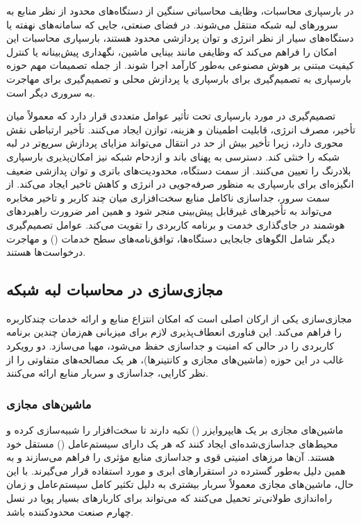 در بارسپاری محاسبات، وظایف محاسباتی سنگین از دستگاه‌های محدود از نظر منابع به سرورهای لبه شبکه منتقل می‌شوند. در فضای صنعتی، جایی که سامانه‌های نهفته یا دستگاه‌های سیار از نظر انرژی و توان پردازشی محدود هستند، بارسپاری محاسبات این امکان را فراهم می‌کند که وظایفی مانند بینایی ماشین، نگهداری پیش‌بینانه یا کنترل کیفیت مبتنی بر هوش مصنوعی به‌طور کارآمد اجرا شوند. از جمله تصمیمات مهم حوزه بارسپاری به تصمیم‌گیری برای بارسپاری یا پردازش محلی و تصمیم‌گیری برای مهاجرت به سرور‌ی دیگر است.

تصمیم‌گیری در مورد بارسپاری تحت تأثیر عوامل متعددی قرار دارد که معمولاً میان تأخیر، مصرف انرژی، قابلیت اطمینان و هزینه، توازن ایجاد می‌کنند. تأخیر ارتباطی نقش محوری دارد، زیرا تأخیر بیش از حد در انتقال می‌تواند مزایای پردازش سریع‌تر در لبه شبکه را خنثی کند. دسترسی به پهنای باند و ازدحام شبکه نیز امکان‌پذیری بارسپاری بلادرنگ را تعیین می‌کنند. از سمت دستگاه، محدودیت‌های باتری و توان پدازشی ضعیف انگیزه‌ای برای بارسپاری به ‌منظور صرفه‌جویی در انرژی و کاهش تاخیر ایجاد می‌کند. از سمت سرور، جداسازی ناکامل منابع سخت‌افزاری میان چند کاربر و تاخیر مخابره می‌تواند به تأخیرهای غیرقابل پیش‌بینی منجر شود و همین امر ضرورت راهبردهای هوشمند در جای‌گذاری خدمت و برنامه کاربردی را تقویت می‌کند. عوامل تصمیم‌گیری دیگر شامل الگوهای جابجایی دستگاه‌ها، توافق‌نامه‌های سطح خدمات () و مهاجرت درخواست‌ها هستند.

\subsection{مجازی‌سازی در محاسبات لبه شبکه}

مجازی‌سازی یکی از ارکان اصلی  است که امکان انتزاع منابع و ارائه خدمات چندکاربره را فراهم می‌کند. این فناوری انعطاف‌پذیری لازم برای میزبانی هم‌زمان چندین برنامه کاربردی را در حالی که امنیت و جداسازی حفظ می‌شود، مهیا می‌سازد. دو رویکرد غالب در این حوزه (ماشین‌های مجازی‌ و کانتینرها)، هر یک مصالحه‌های متفاوتی را از نظر کارایی، جداسازی و سربار منابع ارائه می‌کنند.

\subsubsection{ماشین‌های مجازی}

ماشین‌های مجازی بر یک هایپروایزر () تکیه دارند تا سخت‌افزار را شبیه‌سازی کرده و محیط‌های جداسازی‌شده‌ای ایجاد کنند که هر یک دارای سیستم‌عامل ()  مستقل خود هستند. آن‌ها مرزهای امنیتی قوی و جداسازی منابع مؤثری را فراهم می‌سازند و به همین دلیل به‌طور گسترده در استقرارهای ابری و  مورد استفاده قرار می‌گیرند. با این حال، ماشین‌های مجازی معمولاً سربار بیشتری به دلیل تکثیر کامل سیستم‌عامل و زمان راه‌اندازی طولانی‌تر تحمیل می‌کنند که می‌تواند برای کاربارهای بسیار پویا در نسل چهارم صنعت محدودکننده باشد.

